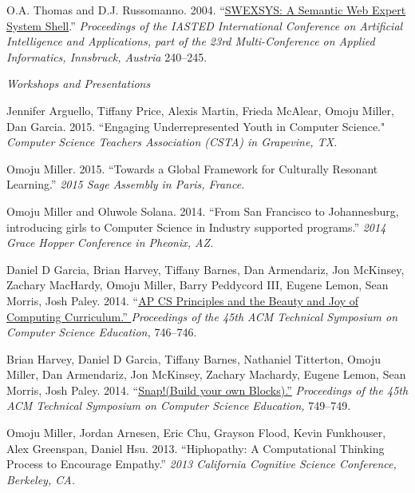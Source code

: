 \documentclass[11pt,article,oneside]{memoir}
\begin{document}
\ind O.A. Thomas and D.J. Russomanno. 2004. ``\href{http://scholar.google.com/citations?view_op=view_citation&hl=en&user=E7z_wrwAAAAJ&citation_for_view=E7z_wrwAAAAJ:2osOgNQ5qMEC}{SWEXSYS: A Semantic Web Expert System Shell}.'' \emph{Proceedings of the IASTED International Conference on Artificial Intelligence and Applications, part of the 23rd Multi-Conference on Applied Informatics, Innsbruck, Austria} 240--245. 

\bigskip

\noindent\emph{Workshops and Presentations  \vspace{0.05in}}


\ind Jennifer Arguello, Tiffany Price, Alexis Martin, Frieda McAlear, Omoju Miller, Dan Garcia. 2015. ``Engaging Underrepresented Youth in Computer Science."  \emph{Computer Science Teachers Association (CSTA) in Grapevine, TX.}

\ind Omoju Miller. 2015. ``Towards a Global Framework for Culturally Resonant Learning.'' \emph{2015 Sage Assembly in Paris, France.} 

\ind Omoju Miller and Oluwole Solana. 2014. ``From San Francisco to Johannesburg, introducing girls to Computer Science in Industry supported programs.'' \emph{2014 Grace Hopper Conference in Pheonix, AZ.}

\ind Daniel D Garcia, Brian Harvey, Tiffany Barnes, Dan Armendariz, Jon McKinsey, Zachary MacHardy, Omoju Miller, Barry Peddycord III, Eugene Lemon, Sean Morris, Josh Paley. 2014. ``\href{http://dl.acm.org/citation.cfm?id=2539026}{AP CS Principles and the Beauty and Joy of Computing Curriculum.'' }\emph{Proceedings of the 45th ACM Technical Symposium on Computer Science Education,} 746--746. 

\ind Brian Harvey, Daniel D Garcia, Tiffany Barnes, Nathaniel Titterton, Omoju Miller, Dan Armendariz, Jon McKinsey, Zachary Machardy, Eugene Lemon, Sean Morris, Josh Paley. 2014. ``\href{http://dl.acm.org/citation.cfm?id=2539022}{Snap!(Build your own Blocks).''} \emph{Proceedings of the 45th ACM Technical Symposium on Computer Science Education,} 749--749. 

\ind Omoju Miller, Jordan Arnesen, Eric Chu, Grayson Flood, Kevin Funkhouser, Alex Greenspan, Daniel Hsu. 2013. ``Hiphopathy: A Computational Thinking Process to Encourage Empathy.'' \emph{2013 California Cognitive Science Conference, Berkeley, CA.} 
 
\end{document}
